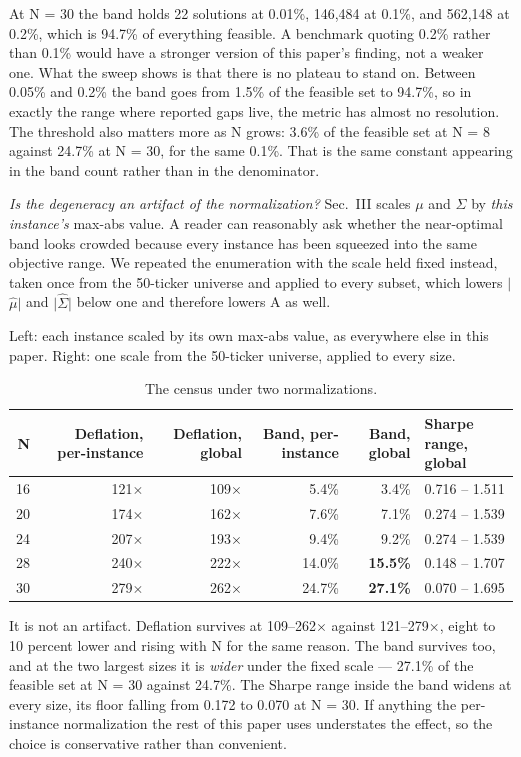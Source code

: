 \documentclass[journal]{IEEEtran}
\begin{document}
At N = 30 the band holds 22 solutions at 0.01\%, 146,484 at 0.1\%, and 562,148 at 0.2\%, which is 94.7\% of everything feasible. A benchmark quoting 0.2\% rather than 0.1\% would have a stronger version of this paper's finding, not a weaker one. What the sweep shows is that there is no plateau to stand on. Between 0.05\% and 0.2\% the band goes from 1.5\% of the feasible set to 94.7\%, so in exactly the range where reported gaps live, the metric has almost no resolution. The threshold also matters more as N grows: 3.6\% of the feasible set at N = 8 against 24.7\% at N = 30, for the same 0.1\%. That is the same constant appearing in the band count rather than in the denominator.


\textit{Is the degeneracy an artifact of the normalization?} Sec.~III scales $\mu$ and $\Sigma$ by \textit{this instance's} max-abs value. A reader can reasonably ask whether the near-optimal band looks crowded because every instance has been squeezed into the same objective range. We repeated the enumeration with the scale held fixed instead, taken once from the 50-ticker universe and applied to every subset, which lowers $|$$\hat{\mu}$$|$ and $|$$\hat{\Sigma}$$|$ below one and therefore lowers A as well.


Left: each instance scaled by its own max-abs value, as everywhere else in this paper. Right: one scale from the 50-ticker universe, applied to every size.


\begin{table}[!t]
\centering
\scriptsize
\caption{The census under two normalizations.}
\label{tab:S6}
\begin{tabular}{rrrrrl}
\toprule
N & Deflation, per-instance & Deflation, global & Band, per-instance & Band, global & Sharpe range, global \\
\midrule
16 & 121$\times$ & 109$\times$ & 5.4\% & 3.4\% & 0.716 -- 1.511 \\
20 & 174$\times$ & 162$\times$ & 7.6\% & 7.1\% & 0.274 -- 1.539 \\
24 & 207$\times$ & 193$\times$ & 9.4\% & 9.2\% & 0.274 -- 1.539 \\
28 & 240$\times$ & 222$\times$ & 14.0\% & \textbf{15.5\%} & 0.148 -- 1.707 \\
30 & 279$\times$ & 262$\times$ & 24.7\% & \textbf{27.1\%} & 0.070 -- 1.695 \\
\bottomrule
\end{tabular}
\end{table}


It is not an artifact. Deflation survives at 109--262$\times$ against 121--279$\times$, eight to 10 percent lower and rising with N for the same reason. The band survives too, and at the two largest sizes it is \textit{wider} under the fixed scale --- 27.1\% of the feasible set at N = 30 against 24.7\%. The Sharpe range inside the band widens at every size, its floor falling from 0.172 to 0.070 at N = 30. If anything the per-instance normalization the rest of this paper uses understates the effect, so the choice is conservative rather than convenient.
\end{document}
